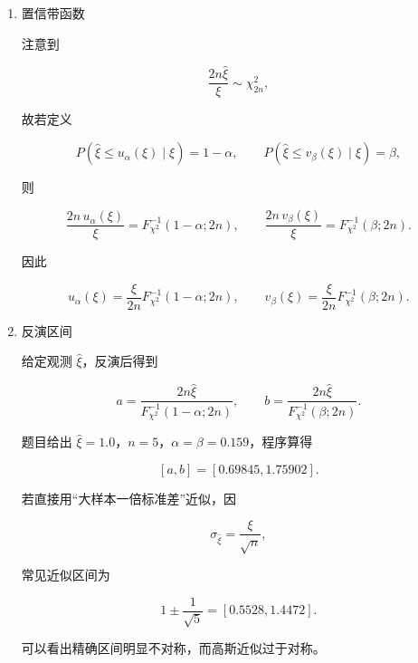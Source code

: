 \begin{question}
\begin{solution}
\begin{enumerate}
\item 置信带函数

注意到

\[
\frac{2n\hat\xi}{\xi}\sim\chi^2_{2n},
\]

故若定义

\[
P(\hat\xi\le u_\alpha(\xi)\mid\xi)=1-\alpha,
\qquad
P(\hat\xi\le v_\beta(\xi)\mid\xi)=\beta,
\]

则

\[
\frac{2n\,u_\alpha(\xi)}{\xi}=F_{\chi^2}^{-1}(1-\alpha;2n),
\qquad
\frac{2n\,v_\beta(\xi)}{\xi}=F_{\chi^2}^{-1}(\beta;2n).
\]

因此

\[
u_\alpha(\xi)=\frac{\xi}{2n}F_{\chi^2}^{-1}(1-\alpha;2n),
\qquad
v_\beta(\xi)=\frac{\xi}{2n}F_{\chi^2}^{-1}(\beta;2n).
\]

\item 反演区间

给定观测 \(\hat\xi\)，反演后得到

\[
a=\frac{2n\hat\xi}{F_{\chi^2}^{-1}(1-\alpha;2n)},
\qquad
b=\frac{2n\hat\xi}{F_{\chi^2}^{-1}(\beta;2n)}.
\]

题目给出 \(\hat\xi=1.0\)，\(n=5\)，\(\alpha=\beta=0.159\)，程序算得

\[
[a,b]=[0.69845,
1.75902].
\]

若直接用``大样本一倍标准差''近似，因

\[
\sigma_{\hat\xi}=\frac{\xi}{\sqrt n},
\]

常见近似区间为

\[
1\pm\frac{1}{\sqrt5}=[0.5528,1.4472].
\]

可以看出精确区间明显不对称，而高斯近似过于对称。
\end{enumerate}
\end{solution}
\end{question}



